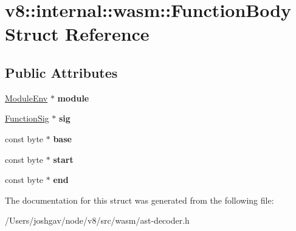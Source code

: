 \hypertarget{structv8_1_1internal_1_1wasm_1_1_function_body}{}\section{v8\+:\+:internal\+:\+:wasm\+:\+:Function\+Body Struct Reference}
\label{structv8_1_1internal_1_1wasm_1_1_function_body}
\subsection*{Public Attributes}
\begin{DoxyCompactItemize}
\item 
\hyperlink{structv8_1_1internal_1_1wasm_1_1_module_env}{Module\+Env} $\ast$ {\bfseries module}\hypertarget{structv8_1_1internal_1_1wasm_1_1_function_body_a80d64ba583d28999c87d732eb53de432}{}\label{structv8_1_1internal_1_1wasm_1_1_function_body_a80d64ba583d28999c87d732eb53de432}

\item 
\hyperlink{classv8_1_1internal_1_1_signature}{Function\+Sig} $\ast$ {\bfseries sig}\hypertarget{structv8_1_1internal_1_1wasm_1_1_function_body_a215eb576b0c198d6d5e38b35abae2f69}{}\label{structv8_1_1internal_1_1wasm_1_1_function_body_a215eb576b0c198d6d5e38b35abae2f69}

\item 
const byte $\ast$ {\bfseries base}\hypertarget{structv8_1_1internal_1_1wasm_1_1_function_body_a696dd9ccd6a31ea00e959b7086c958f0}{}\label{structv8_1_1internal_1_1wasm_1_1_function_body_a696dd9ccd6a31ea00e959b7086c958f0}

\item 
const byte $\ast$ {\bfseries start}\hypertarget{structv8_1_1internal_1_1wasm_1_1_function_body_aed2f017a2c7e4ddd126aa8d09708564f}{}\label{structv8_1_1internal_1_1wasm_1_1_function_body_aed2f017a2c7e4ddd126aa8d09708564f}

\item 
const byte $\ast$ {\bfseries end}\hypertarget{structv8_1_1internal_1_1wasm_1_1_function_body_a3beb810e639bc9ea8d3be60ff4ea6348}{}\label{structv8_1_1internal_1_1wasm_1_1_function_body_a3beb810e639bc9ea8d3be60ff4ea6348}

\end{DoxyCompactItemize}


The documentation for this struct was generated from the following file\+:\begin{DoxyCompactItemize}
\item 
/\+Users/joshgav/node/v8/src/wasm/ast-\/decoder.\+h\end{DoxyCompactItemize}
